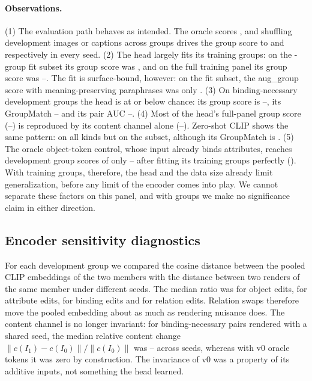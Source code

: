 \paragraph{Observations.}
(1) The evaluation path behaves as intended. The oracle scores \SPoracleBNGroup, and shuffling
development images or captions across groups drives the \bn{} group score to
\SPimgShufBNGroupMax{} and \SPtxtShufBNGroupMax{} respectively in every seed.
(2) The head largely fits its training groups: on the \SPfitN{}-group fit subset its group score
was \SPfitGroup, and on the full training panel its \bn{} group score was
\SPtrainBNGroupMin--\SPtrainBNGroupMax. The fit is surface-bound, however: on the fit subset,
the aug\_group score with meaning-preserving paraphrases was only \SPfitAugGroup.
(3) On binding-necessary development groups the head is at or below chance: its group score is
\SPdevBNGroupMin--\SPdevBNGroupMax{}, its GroupMatch \SPdevBNMatchMin--\SPdevBNMatchMax{} and
its pair AUC \SPdevBNAUCMin--\SPdevBNAUCMax.
(4) Most of the head's full-panel group score (\SPdevAllGroupMin--\SPdevAllGroupMax) is
reproduced by its content channel alone (\SPcontentAllGroupMin--\SPcontentAllGroupMax).
Zero-shot CLIP shows the same pattern: \SPzsAllGroup{} on all kinds but \SPzsBNGroup{} on the \bn{}
subset, although its \bn{} GroupMatch is \SPzsBNMatch.
(5) The oracle object-token control, whose input already binds attributes, reaches \bn{}
development group scores of only \SPotcBNGroupMin--\SPotcBNGroupMax{} after fitting its training
groups perfectly (\SPotcTrainBNGroupMin). With \SPtrainGroups{} training groups, therefore, the
head and the data size already limit generalization, before any limit of the encoder comes into
play. We cannot separate these factors on this panel, and with \SPdevBNn{} \bn{} groups we make no
significance claim in either direction.

\subsection{Encoder sensitivity diagnostics}
For each development group we compared the cosine distance between the pooled CLIP embeddings of
the two members with the distance between two renders of the same member under different seeds. The
median ratio was \SPnuisObject{} for object edits, \SPnuisAttribute{} for attribute edits,
\SPnuisBinding{} for binding edits and \SPnuisRelation{} for relation edits. Relation swaps
therefore move the pooled embedding about as much as rendering nuisance does. The content channel
is no longer invariant: for binding-necessary pairs rendered with a shared seed, the median relative
content change $\|c(I_1)-c(I_0)\|/\|c(I_0)\|$ was \SPcontentResidMin--\SPcontentResidMax{} across
seeds, whereas with v0 oracle tokens it was zero by construction. The invariance of v0 was a
property of its additive inputs, not something the head learned.

